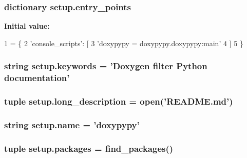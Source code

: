 \hypertarget{namespacesetup_a39223b27836ad859b536b5b1dc23f322}{
\subsubsection[{entry\-\_\-points}]{\setlength{\rightskip}{0pt plus 5cm}dictionary setup.\-entry\-\_\-points}}\label{namespacesetup_a39223b27836ad859b536b5b1dc23f322}
{\bfseries Initial value\-:}
\begin{DoxyCode}
1 = \{
2         \textcolor{stringliteral}{'console\_scripts'}: [
3             \textcolor{stringliteral}{'doxypypy = doxypypy.doxypypy:main'}
4         ]
5     \}
\end{DoxyCode}
\hypertarget{namespacesetup_a13f1455f03aed281ae4f7619aaa7f57b}{
\subsubsection[{keywords}]{\setlength{\rightskip}{0pt plus 5cm}string setup.\-keywords = 'Doxygen filter Python documentation'}}\label{namespacesetup_a13f1455f03aed281ae4f7619aaa7f57b}
\hypertarget{namespacesetup_acaf26e8be236d4bfa129f4c0f4f53baf}{
\subsubsection[{long\-\_\-description}]{\setlength{\rightskip}{0pt plus 5cm}tuple setup.\-long\-\_\-description = open('R\-E\-A\-D\-M\-E.\-md')}}\label{namespacesetup_acaf26e8be236d4bfa129f4c0f4f53baf}
\hypertarget{namespacesetup_a61de3710bf6c9d78c0afa352263f8b09}{
\subsubsection[{name}]{\setlength{\rightskip}{0pt plus 5cm}string setup.\-name = 'doxypypy'}}\label{namespacesetup_a61de3710bf6c9d78c0afa352263f8b09}
\hypertarget{namespacesetup_aac31bc6390743c46ed466881a9d62eb2}{
\subsubsection[{packages}]{\setlength{\rightskip}{0pt plus 5cm}tuple setup.\-packages = find\-\_\-packages()}}\label{namespacesetup_aac31bc6390743c46ed466881a9d62eb2}
